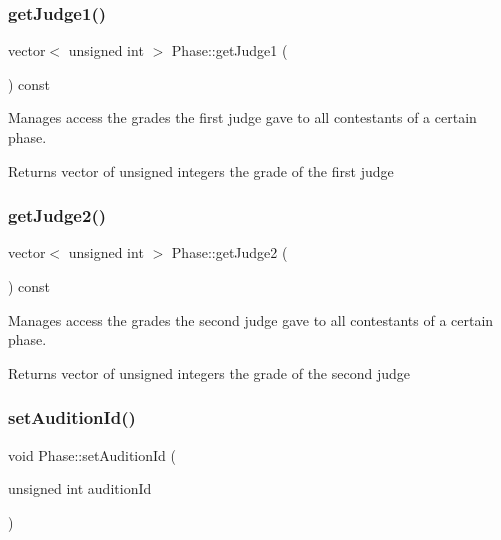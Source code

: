 \subsubsection{\texorpdfstring{get\+Judge1()}{getJudge1()}}
{\footnotesize\ttfamily vector$<$ unsigned int $>$ Phase\+::get\+Judge1 (\begin{DoxyParamCaption}{ }\end{DoxyParamCaption}) const}



Manages access the grades the first judge gave to all contestants of a certain phase. 

\begin{DoxyReturn}{Returns}
vector of unsigned integers the grade of the first judge 
\end{DoxyReturn}
\mbox{\label{class_phase_ac8f4328b114a36e3296ee2f4e9fd06e8}} 
\subsubsection{\texorpdfstring{get\+Judge2()}{getJudge2()}}
{\footnotesize\ttfamily vector$<$ unsigned int $>$ Phase\+::get\+Judge2 (\begin{DoxyParamCaption}{ }\end{DoxyParamCaption}) const}



Manages access the grades the second judge gave to all contestants of a certain phase. 

\begin{DoxyReturn}{Returns}
vector of unsigned integers the grade of the second judge 
\end{DoxyReturn}
\mbox{\label{class_phase_af2bc70b0e24880d38e42f37ef31164ac}} 
\subsubsection{\texorpdfstring{set\+Audition\+Id()}{setAuditionId()}}
{\footnotesize\ttfamily void Phase\+::set\+Audition\+Id (\begin{DoxyParamCaption}\item[{unsigned int}]{audition\+Id }\end{DoxyParamCaption})}



